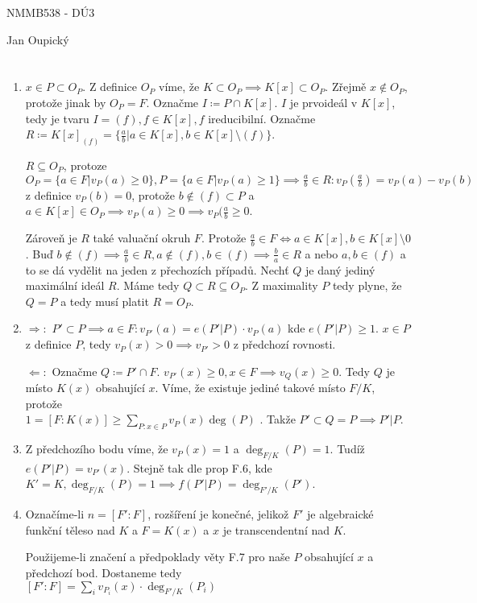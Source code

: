 \documentclass[12pt, a4paper]{article}
\begin{document}
\begin{center}
\large NMMB538 - DÚ3

\normalsize Jan Oupický
\end{center}
\vspace{1\baselineskip}

\section{}
\begin{enumerate}[label=(\alph*)]
    \item $x \in P \subset O_P$. Z definice $O_P$ víme, že $K \subset O_P \implies K[x] \subset O_P$. Zřejmě $x\notin O_P$, protože jinak by $O_P = F$. Označme $I \coloneqq P \cap K[x]$. $I$ je prvoideál v $K[x]$, tedy je tvaru $I = (f), f \in K[x], f$ ireducibilní. Označme $R \coloneqq K[x]_{(f)} = \{ \frac{a}{b} | a \in K[x], b \in K[x] \setminus (f) \}$. 

    $R \subseteq O_P$, protoze $O_P = \{a \in F | v_P(a) \geq 0 \}, P = \{ a \in F | v_P(a) \geq 1 \} \implies \frac{a}{b} \in R: v_P(\frac{a}{b}) = v_P(a)-v_P(b)$ z definice $v_P(b)=0$, protože $b \notin (f) \subset P$ a $a \in K[x] \in O_P \implies v_P(a) \geq 0 \implies v_P(\frac{a}{b} \geq 0$. 

    Zároveň je $R$ také valuační okruh $F$. Protože $\frac{a}{b} \in F \iff a \in K[x], b \in K[x]\setminus 0$. Buď $b \notin (f) \implies \frac{a}{b} \in R, a \notin (f), b \in (f) \implies \frac{b}{a} \in R$ a nebo $a,b \in (f)$ a to se dá vydělit na jeden z přechozích případů. Nechť $Q$ je daný jediný maximální ideál $R$. Máme tedy $Q \subset R \subseteq O_P$. Z maximality $P$ tedy plyne, že $Q = P$ a tedy musí platit $R = O_P$.

    \item $\Rightarrow:$ $P' \subset P \implies a\in F : v_{P'}(a) = e(P'|P)\cdot v_P(a)$ kde $e(P'|P)\geq 1$. $x \in P$ z definice $P$, tedy $v_P(x) > 0 \implies v_{P'} > 0$ z předchozí rovnosti.

    $\Leftarrow:$ Označme $Q \coloneqq P' \cap F$. $v_{P'}(x)\geq 0, x \in F \implies v_Q(x) \geq 0$. Tedy $Q$ je místo $K(x)$ obsahující $x$. Víme, že existuje jediné takové místo $F/K$, protože \\$1=[F:K(x)]\geq \sum_{P:x\in P} v_P(x)\deg(P)$ . Takže $P' \subset Q = P \implies P' | P$.

    \item Z předchozího bodu víme, že $v_P(x)=1$ a $\deg_{F/K}(P)=1$. Tudíž $e(P'|P)=v_{P'}(x)$. Stejně tak dle prop F.6, kde $K'=K, \deg_{F/K}(P)=1 \implies f(P'|P)=\deg_{F'/K}(P')$.
    \item Označíme-li $n = [F':F]$, rozšíření je konečné, jelikož $F'$ je algebraické funkční těleso nad $K$ a $F=K(x)$ a $x$ je transcendentní nad $K$.

    Použijeme-li značení a předpoklady věty F.7 pro naše $P$ obsahující $x$ a předchozí bod. Dostaneme tedy \\$[F':F]=\sum_i v_{P_i}(x)\cdot \deg_{F'/K}(P_i)$
\end{enumerate}
\end{document}
